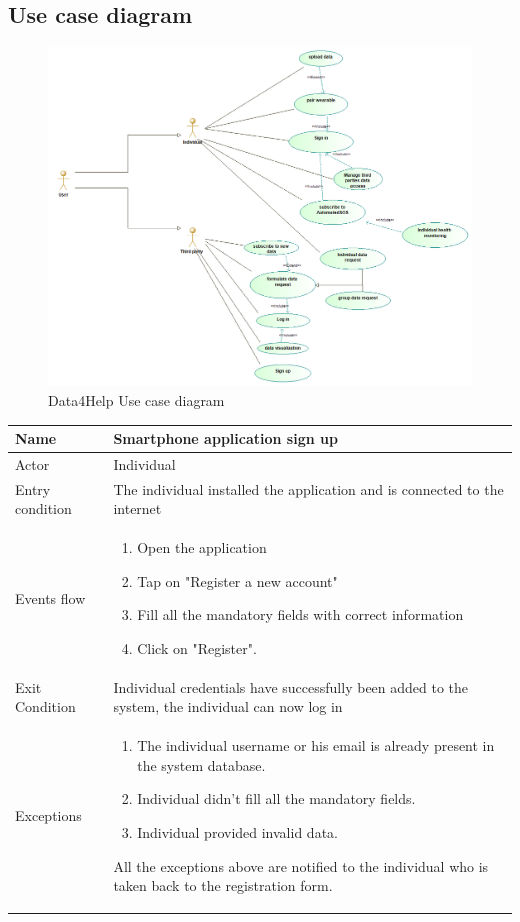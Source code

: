 \subsection{Use case diagram}
\begin{figure}[H]
  \includegraphics[width=1.10\linewidth]{resources/UML/GeneralUseCase.png}
  \caption{Data4Help Use case diagram}
  \label{fig:Use case diagram}
\end{figure}

\givespace

\begin{tabular}{|l|p{11cm}|}
    \hline
    Name & Smartphone application sign up
    \\ \hline
    Actor & Individual
    \\ \hline 
    Entry condition & The individual installed the application and is connected to the internet
    \\ \hline
    Events flow &
    \begin{enumerate}
    \item Open the application
    \item Tap on "Register a new account"
    \item Fill all the mandatory fields with correct information
    \item Click on "Register".
    \end{enumerate}
     \\ \hline
     Exit Condition & Individual credentials have successfully been added to the system,
     the individual can now log in     
     \\
    \hline
    Exceptions &
        \begin{enumerate}
    \item The individual username or his email is already present in the system database.
    \item Individual didn't fill all the mandatory fields.
    \item Individual provided invalid data.
    \end{enumerate}
    All the exceptions above are notified to the individual who is taken back to the registration form.
      \\
    \hline
\end{tabular}

